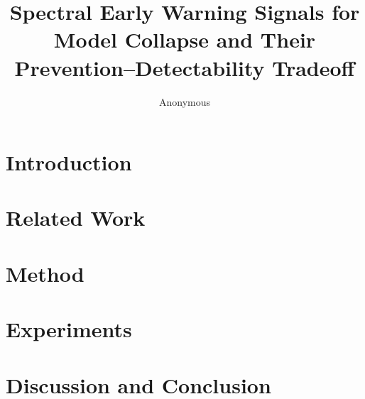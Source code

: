 \documentclass[11pt]{article}
\title{Spectral Early Warning Signals for Model Collapse and Their Prevention--Detectability Tradeoff}
\author{Anonymous}
\begin{document}
\maketitle

\begin{abstract}

\end{abstract}

\section{Introduction}
\label{sec:intro}


\section{Related Work}
\label{sec:related}


\section{Method}
\label{sec:method}


\section{Experiments}
\label{sec:experiments}


\section{Discussion and Conclusion}
\label{sec:conclusion}






\appendix

\end{document}
